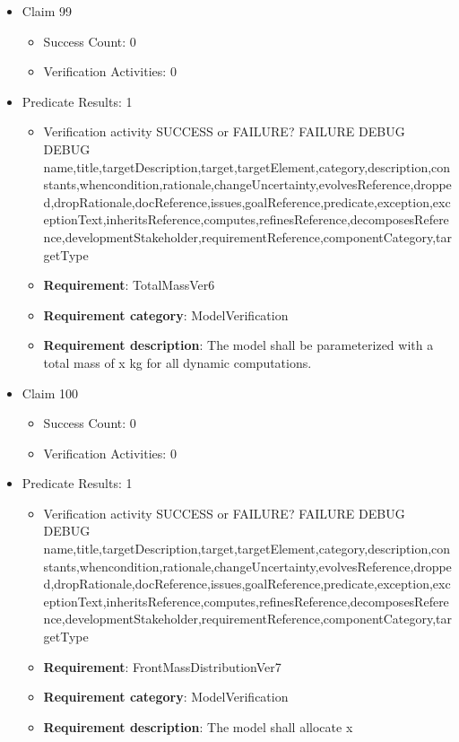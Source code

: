 \documentclass{article}
\begin{document}
\begin{itemize}
  				  \item Claim 99
				\begin{itemize}
			    	\item Success Count: 0 
			    	\item Verification Activities: 0
				\end{itemize}
				
									    
				\item Predicate Results: 1
					\begin{itemize}				
					\item Verification activity SUCCESS or FAILURE? FAILURE
					DEBUG DEBUG name,title,targetDescription,target,targetElement,category,description,constants,whencondition,rationale,changeUncertainty,evolvesReference,dropped,dropRationale,docReference,issues,goalReference,predicate,exception,exceptionText,inheritsReference,computes,refinesReference,decomposesReference,developmentStakeholder,requirementReference,componentCategory,targetType
					\item \textbf{Requirement}: TotalMassVer6 
					\item \textbf{Requirement category}: ModelVerification
					\item \textbf{Requirement description}: The model shall be parameterized with a total mass of x kg for all dynamic computations.
					\end{itemize}

  				  \item Claim 100
				\begin{itemize}
			    	\item Success Count: 0 
			    	\item Verification Activities: 0
				\end{itemize}
				
									    
				\item Predicate Results: 1
					\begin{itemize}				
					\item Verification activity SUCCESS or FAILURE? FAILURE
					DEBUG DEBUG name,title,targetDescription,target,targetElement,category,description,constants,whencondition,rationale,changeUncertainty,evolvesReference,dropped,dropRationale,docReference,issues,goalReference,predicate,exception,exceptionText,inheritsReference,computes,refinesReference,decomposesReference,developmentStakeholder,requirementReference,componentCategory,targetType
					\item \textbf{Requirement}: FrontMassDistributionVer7 
					\item \textbf{Requirement category}: ModelVerification
					\item \textbf{Requirement description}: The model shall allocate x%
					\end{itemize}


\end{itemize}
\end{document}
